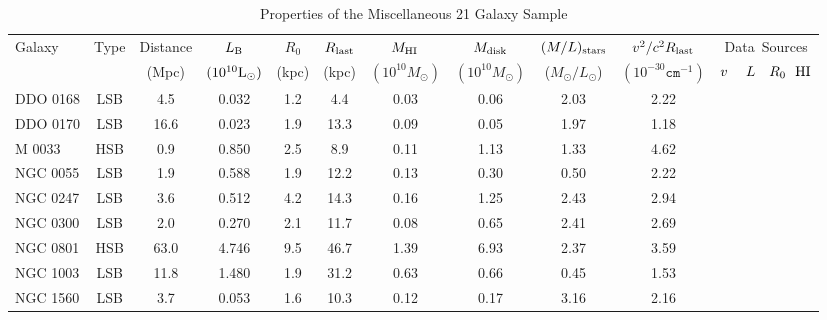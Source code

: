 \documentclass[preprint,aps]{revtex4}
\begin{document}
\begin{table}
\caption{Properties of the Miscellaneous 21 Galaxy Sample}
\centering
\begin{tabular}{l c c c c c c c c c c} 
\hline\hline
 \phantom{00}Galaxy  & \phantom{0}Type \phantom{0}&Distance  & $L_{\rm  B}$ & $R_0$  & $R_{\rm last} $ &  $M_{\rm HI} $ & $M_{\rm disk}$ &  $ 
(M/L) _{\rm stars}$ & $v^2 / c^2 R_{\rm last}$ & Data~Sources \\  
& &  (Mpc)  &  $(10^{10}{\rm L}_{\odot})$&(kpc) & (kpc) & {$(10^{10} M_\odot)$} & {$(10^{10}
M_\odot)$} & ({$M_{\odot}/L_{\odot}$}) & {$(10^{-30}\texttt{cm}^{-1})$} & $v~~~~L~~~R_0~~{\rm HI}$\\
\hline
DDO 0168 & LSB&\phantom{0}4.5& \phantom{0}0.032    &1.2 & \phantom{0}4.4 & 0.03 &
\phantom{0}0.06 & 2.03& 2.22 & \cite{Broeils1992} \cite{Broeils1992} \cite{Broeils1992} \cite{Broeils1992}
\\
DDO 0170 & LSB& 16.6 &  \phantom{0}0.023    & 1.9 & 13.3 & 0.09 &
\phantom{0}0.05 & 1.97 &1.18 & \cite{Lake1990} \cite{Lake1990} \cite{Lake1990} \cite{Lake1990}
\\
\phantom{CC}M 0033& HSB &\phantom{0}0.9 &  \phantom{0}0.850   &2.5 & \phantom{0}8.9 & 0.11 &\phantom{0}1.13 &1.33& 4.62 &\cite{Rhee1996} \cite{Rhee1996} \cite{Kent1987b} \cite{Rhee1996}
\\
NGC 0055 & LSB& \phantom{0}1.9 &  \phantom{0}0.588  & 1.9 & 12.2 & 0.13 &  \phantom{0}0.30 & 0.50 & 2.22 & \cite{Puche1991}  \cite{Puche1991}  \cite{Puche1991}  \cite{Puche1991}
\\
NGC 0247 & LSB & \phantom{0}3.6 &  \phantom{0}0.512    & 4.2 & 14.3 & 0.16 &
\phantom{0}1.25 & 2.43 & 2.94& \cite{Carignan1990} \cite{Carignan1985a} \cite{Carignan1985a} \cite{Carignan1990}
\\
NGC 0300 &LSB &\phantom{0}2.0&   \phantom{0}0.270  &2.1&11.7& 0.08 &\phantom{0}0.65
&2.41 & 2.69& \cite{Puche1990} \cite{Carignan1985a} \cite{Carignan1985a} \cite{Puche1990}
\\
NGC 0801 & HSB &63.0 &   \phantom{0}4.746   & 9.5 & 46.7 & 1.39 & \phantom{0}6.93 &
2.37 & 3.59 & \cite{Broeils1992} \cite{Broeils1992} \cite{Kent1986} \cite{Broeils1992} 
\\
NGC 1003 &LSB& 11.8 &  \phantom{0}1.480    & 1.9 & 31.2 & 0.63 &  \phantom{0}0.66 &0.45 & 1.53& \cite{Rhee1996} \cite{Rhee1996} \cite{Broeils1991} \cite{Sanders1996} 
\\
NGC 1560 & LSB & \phantom{0}3.7 &  \phantom{0}0.053    & 1.6 & 10.3 & 0.12 &
\phantom{0}0.17 & 3.16 & 2.16& \cite{Broeils1992}  \cite{Broeils1992}  \cite{Broeils1992}  \cite{Broeils1992}

\end{tabular}
\end{table}
\end{document}
